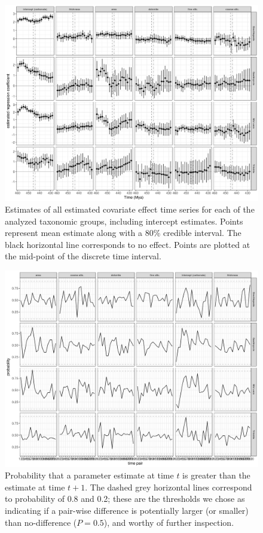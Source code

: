 \documentclass[12pt,letterpaper]{article}
\begin{document}
\begin{figure}[ht]
  \centering
  \includegraphics[width=\textwidth,height=0.5\textheight,keepaspectratio=true]{figure/cov_time}
  \caption{Estimates of all estimated covariate effect time series for each of the analyzed taxonomic groups, including intercept estimates. Points represent mean estimate along with a 80\% credible interval. The black horizontal line corresponds to no effect. Points are plotted at the mid-point of the discrete time interval.}
  \label{fig:time_cov}
\end{figure}

\begin{figure}[ht]
  \centering
  \includegraphics[width=\textwidth,height=0.5\textheight,keepaspectratio=true]{figure/cov_diff}
  \caption{Probability that a parameter estimate at time \(t\) is greater than the estimate at time \(t + 1\). The dashed grey horizontal lines correspond to probability of 0.8 and 0.2; these are the thresholds we chose as indicating if a pair-wise difference is potentially larger (or smaller) than no-difference (\(P = 0.5\)), and worthy of further inspection.}
  \label{fig:diff_cov}
\end{figure}
\end{document}
